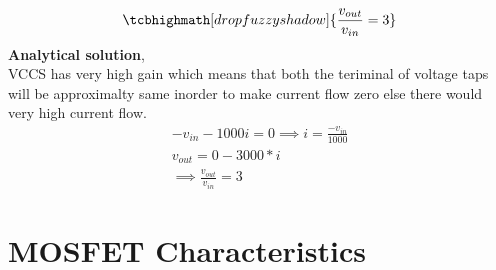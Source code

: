 \documentclass{article}
\begin{document}
\begin{equation*}
\tcbhighmath[drop fuzzy shadow]{\frac{v_{out}}{v_{in}} = 3}
\end{equation*}
\textbf{Analytical solution},\\
VCCS has very high gain which means that both the teriminal of voltage taps will be approximalty same inorder to make current flow zero else there would very high current flow.\\
\begin{gather*}
-v_{in} -1000i = 0 \implies i = \frac{-v_{in}}{1000}\\
v_{out} = 0 - 3000*i\\
\implies \frac{v_{out}}{v_{in}} = 3
\end{gather*}

\section{MOSFET Characteristics}
\end{document}
